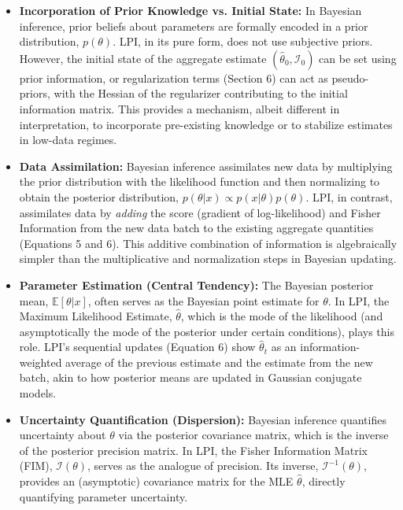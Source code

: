 \documentclass[11pt]{article}
\begin{document}
\begin{itemize}
    \item \textbf{Incorporation of Prior Knowledge vs. Initial State:}
    In Bayesian inference, prior beliefs about parameters are formally encoded in a prior distribution, $p(\theta)$. LPI, in its pure form, does not use subjective priors. However, the initial state of the aggregate estimate $(\hat\theta_0, \mathcal{I}_0)$ can be set using prior information, or regularization terms (Section 6) can act as pseudo-priors, with the Hessian of the regularizer contributing to the initial information matrix. This provides a mechanism, albeit different in interpretation, to incorporate pre-existing knowledge or to stabilize estimates in low-data regimes.

    \item \textbf{Data Assimilation:}
    Bayesian inference assimilates new data by multiplying the prior distribution with the likelihood function and then normalizing to obtain the posterior distribution, $p(\theta|x) \propto p(x|\theta)p(\theta)$. LPI, in contrast, assimilates data by \textit{adding} the score (gradient of log-likelihood) and Fisher Information from the new data batch to the existing aggregate quantities (Equations 5 and 6). This additive combination of information is algebraically simpler than the multiplicative and normalization steps in Bayesian updating.

    \item \textbf{Parameter Estimation (Central Tendency):}
    The Bayesian posterior mean, $\mathbb{E}[\theta|x]$, often serves as the Bayesian point estimate for $\theta$. In LPI, the Maximum Likelihood Estimate, $\hat{\theta}$, which is the mode of the likelihood (and asymptotically the mode of the posterior under certain conditions), plays this role. LPI's sequential updates (Equation 6) show $\hat{\theta}_t$ as an information-weighted average of the previous estimate and the estimate from the new batch, akin to how posterior means are updated in Gaussian conjugate models.

    \item \textbf{Uncertainty Quantification (Dispersion):}
    Bayesian inference quantifies uncertainty about $\theta$ via the posterior covariance matrix, which is the inverse of the posterior precision matrix. In LPI, the Fisher Information Matrix (FIM), $\mathcal{I}(\theta)$, serves as the analogue of precision. Its inverse, $\mathcal{I}^{-1}(\theta)$, provides an (asymptotic) covariance matrix for the MLE $\hat{\theta}$, directly quantifying parameter uncertainty.


\end{itemize}
\end{document}
